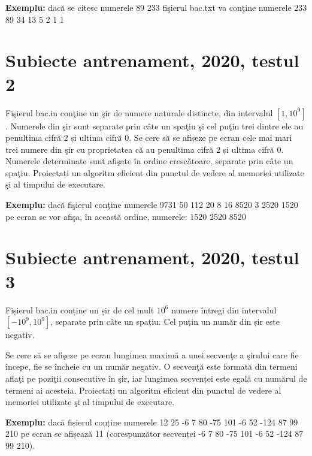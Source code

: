 \documentclass[10pt, a4paper]{article}
\newcommand{\highlight}[1]{{\ttfamily\color{red}#1}}
\begin{document}
\vspace{0.2cm}
\noindent \textbf{Exemplu:} dacă se citesc numerele \highlight{89 233} fişierul \highlight{bac.txt} va conţine numerele \highlight{233 89 34 13 5 2 1 1}


\section{Subiecte antrenament, 2020, testul 2}
Fişierul \highlight{bac.in} conţine un şir de numere naturale distincte, din intervalul \highlight{$[1,10^9]$}. Numerele din şir sunt separate prin câte un spaţiu şi cel puţin trei dintre ele au penultima cifră \highlight{$2$} și ultima cifră \highlight{$0$}. Se cere să se afișeze pe ecran cele mai mari trei numere din şir cu proprietatea că au penultima cifră \highlight{$2$} și ultima cifră \highlight{$0$}. Numerele determinate sunt afişate în ordine crescătoare, separate prin câte un spaţiu. Proiectați un algoritm eficient din punctul de vedere al memoriei utilizate şi al timpului de executare.

\vspace{0.2cm}
\noindent \textbf{Exemplu:} dacă fişierul conţine numerele \highlight{9731 50 112 20 8 16 8520 3 2520 1520} pe ecran se vor afişa, în această ordine, numerele: \highlight{1520 2520 8520}

\section{Subiecte antrenament, 2020, testul 3}
Fișierul \highlight{bac.in} conține un șir de cel mult \highlight{$10^6$} numere întregi din intervalul \highlight{$[-10^9,10^9]$}, separate prin câte un spațiu. Cel puțin un număr din șir este negativ.

\vspace{0.2cm}
\noindent Se cere să se afişeze pe ecran lungimea maximă a unei secvenţe a şirului care fie începe, fie se încheie cu un număr negativ. O secvenţă este formată din termeni aflaţi pe poziţii consecutive în şir, iar lungimea secvenței este egală cu numărul de termeni ai acesteia. Proiectați un algoritm eficient din punctul de vedere al memoriei utilizate şi al timpului de executare.

\vspace{0.2cm}
\noindent \textbf{Exemplu:} dacă fișierul conține numerele \highlight{12 25 -6 7 80 -75 101 -6 52 -124 87 99 210} pe ecran se afișează \highlight{11} (corespunzător secvenței \highlight{-6 7 80 -75 101 -6 52 -124 87 99 210}).
\end{document}
